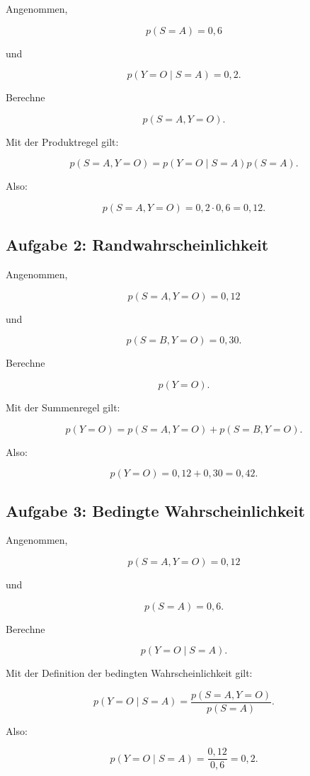 Angenommen,

\[
    p(S=A) = 0{,}6
\]

und

\[
    p(Y=O \mid S=A) = 0{,}2.
\]

Berechne

\[
    p(S=A,Y=O).
\]

\begin{examplebox}
Mit der Produktregel gilt:

\[
    p(S=A,Y=O)
    =
    p(Y=O \mid S=A)p(S=A).
\]

Also:

\[
    p(S=A,Y=O)
    =
    0{,}2 \cdot 0{,}6
    =
    0{,}12.
\]
\end{examplebox}

\subsection{Aufgabe 2: Randwahrscheinlichkeit}

Angenommen,

\[
    p(S=A,Y=O) = 0{,}12
\]

und

\[
    p(S=B,Y=O) = 0{,}30.
\]

Berechne

\[
    p(Y=O).
\]

\begin{examplebox}
Mit der Summenregel gilt:

\[
    p(Y=O)
    =
    p(S=A,Y=O)
    +
    p(S=B,Y=O).
\]

Also:

\[
    p(Y=O)
    =
    0{,}12 + 0{,}30
    =
    0{,}42.
\]
\end{examplebox}

\subsection{Aufgabe 3: Bedingte Wahrscheinlichkeit}

Angenommen,

\[
    p(S=A,Y=O) = 0{,}12
\]

und

\[
    p(S=A) = 0{,}6.
\]

Berechne

\[
    p(Y=O \mid S=A).
\]

\begin{examplebox}
Mit der Definition der bedingten Wahrscheinlichkeit gilt:

\[
    p(Y=O \mid S=A)
    =
    \frac{p(S=A,Y=O)}{p(S=A)}.
\]

Also:

\[
    p(Y=O \mid S=A)
    =
    \frac{0{,}12}{0{,}6}
    =
    0{,}2.
\]
\end{examplebox}

